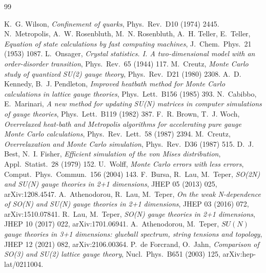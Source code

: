 \documentclass[11pt]{article}
\begin{document}
\begin{thebibliography}{99}

 K.~G. Wilson, \emph{Confinement of quarks}, Phys.\ Rev.\ D10 (1974) 2445.
 N.~Metropolis, A.~W. Rosenbluth, M.~N. Rosenbluth, A.~H. Teller, E.~Teller, \emph{Equation of state calculations by fast computing machines}, J.\ Chem.\ Phys.\ 21 (1953) 1087.
 L.~Onsager, \emph{Crystal statistics. I. A two-dimensional model with an order-disorder transition}, Phys.\ Rev.\ 65 (1944) 117.
 M.~Creutz, \emph{Monte Carlo study of quantized SU(2) gauge theory}, Phys.\ Rev.\ D21 (1980) 2308.
 A.~D. Kennedy, B.~J. Pendleton, \emph{Improved heatbath method for Monte Carlo calculations in lattice gauge theories}, Phys.\ Lett.\ B156 (1985) 393.
 N.~Cabibbo, E.~Marinari, \emph{A new method for updating SU(N) matrices in computer simulations of gauge theories}, Phys.\ Lett.\ B119 (1982) 387.
 F.~R. Brown, T.~J. Woch, \emph{Overrelaxed heat-bath and Metropolis algorithms for accelerating pure gauge Monte Carlo calculations}, Phys.\ Rev.\ Lett.\ 58 (1987) 2394.
 M.~Creutz, \emph{Overrelaxation and Monte Carlo simulation}, Phys.\ Rev.\ D36 (1987) 515.
 D.~J. Best, N.~I. Fisher, \emph{Efficient simulation of the von Mises distribution}, Appl.\ Statist.\ 28 (1979) 152.
 U.~Wolff, \emph{Monte Carlo errors with less errors}, Comput.\ Phys.\ Commun.\ 156 (2004) 143.
 F.~Bursa, R.~Lau, M.~Teper, \emph{SO(2N) and SU(N) gauge theories in 2+1 dimensions}, JHEP 05 (2013) 025, arXiv:1208.4547.
 A.~Athenodorou, R.~Lau, M.~Teper, \emph{On the weak N-dependence of SO(N) and SU(N) gauge theories in 2+1 dimensions}, JHEP 03 (2016) 072, arXiv:1510.07841.
 R.~Lau, M.~Teper, \emph{SO(N) gauge theories in 2+1 dimensions}, JHEP 10 (2017) 022, arXiv:1701.06941.
 A.~Athenodorou, M.~Teper, \emph{$SU(N)$ gauge theories in 3+1 dimensions: glueball spectrum, string tensions and topology}, JHEP 12 (2021) 082, arXiv:2106.00364.
 P.~de Forcrand, O.~Jahn, \emph{Comparison of SO(3) and SU(2) lattice gauge theory}, Nucl.\ Phys.\ B651 (2003) 125, arXiv:hep-lat/0211004.

\end{thebibliography}
\end{document}
